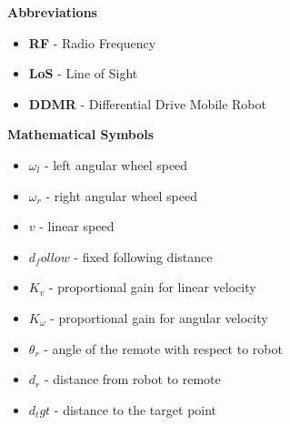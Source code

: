 
\renewcommand{\nomname}{Nomenclature}
\renewcommand{\nomAname}{\textbf{\large Abbreviations}}
\renewcommand{\nomGname}{\textbf{\large Mathematical Symbols}}
\renewcommand{\nomXname}{\textbf{\large Superscripts}}
\renewcommand{\nomZname}{\textbf{\large Subscripts}}

\printnomenclature
\cleardoublepage
{} %


\nomAname
\begin{itemize}
    \item[]\textbf{RF} - Radio Frequency
    \item[]\textbf{LoS} - Line of Sight
    \item[]\textbf{DDMR} - Differential Drive Mobile Robot
      
\end{itemize}
\bigbreak

\nomGname
\begin{itemize}
	\item[]$\omega_l$ - left angular wheel speed
	\item[]$\omega_r$ - right angular wheel speed
	\item[]$v$ - linear speed
	\item[]$d_follow$ - fixed following distance 
    \item[]$K_v$ - proportional gain for linear velocity
    \item[]$K_\omega$ - proportional gain for angular velocity
    \item[]$\theta_r$ - angle of the remote with respect to robot
    \item[]$d_r$ - distance from robot to remote
    \item[]$d_tgt$ - distance to the target point

\end{itemize}


